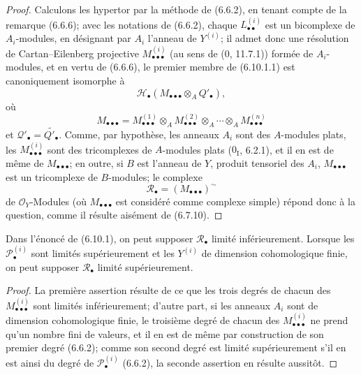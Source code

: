 \begin{proof}
Calculons les hypertor par la méthode de (6.6.2), en tenant compte de la remarque
(6.6.6); avec les notations de (6.6.2), chaque
$L_{\bullet\bullet}^{(i)}$ est un bicomplexe de $A_i$-modules, en désignant par
$A_i$ l'anneau de $Y^{(i)}$; il admet donc une résolution de Cartan--Eilenberg
projective $M_{\bullet\bullet\bullet}^{(i)}$ (au sens de (0, 11.7.1)) formée de
$A_i$-modules, et en vertu de (6.6.6), le premier membre de (6.10.1.1) est
canoniquement isomorphe à
\[
  \mathscr H_\bullet
  (M_{\bullet\bullet\bullet}\otimes_A Q'_\bullet),
\]
où
\[
  M_{\bullet\bullet\bullet}
  =
  M_{\bullet\bullet\bullet}^{(1)}
  \otimes_A M_{\bullet\bullet\bullet}^{(2)}
  \otimes_A\cdots\otimes_A M_{\bullet\bullet\bullet}^{(n)}
\]
et $\mathscr Q'_\bullet=\widetilde{Q'_\bullet}$. Comme, par hypothèse, les
anneaux $A_i$ sont des $A$-modules plats, les
$M_{\bullet\bullet\bullet}^{(i)}$ sont des tricomplexes de $A$-modules plats
($0_{\mathrm I}$, 6.2.1), et il en est de même de
$M_{\bullet\bullet\bullet}$; en outre, si $B$ est l'anneau de $Y$, produit
tensoriel des $A_i$, $M_{\bullet\bullet\bullet}$ est un tricomplexe de
$B$-modules; le complexe
\[
  \mathscr R_\bullet=(M_{\bullet\bullet\bullet})^\sim
\]
de $\mathscr O_Y$-Modules (où $M_{\bullet\bullet\bullet}$ est considéré comme
complexe simple) répond donc à la question, comme il résulte aisément de
(6.7.10).
\end{proof}

\begin{corollary}[6.10.2]
Dans l'énoncé de (6.10.1), on peut supposer $\mathscr R_\bullet$ limité
inférieurement. Lorsque les $\mathscr P_\bullet^{(i)}$ sont limités
supérieurement et les $Y^{(i)}$ de dimension cohomologique finie, on peut
supposer $\mathscr R_\bullet$ limité supérieurement.
\end{corollary}

\begin{proof}
La première assertion résulte de ce que les trois degrés de chacun des
$M_{\bullet\bullet\bullet}^{(i)}$ sont limités inférieurement; d'autre part, si
les anneaux $A_i$ sont de dimension cohomologique finie, le troisième degré de
chacun des $M_{\bullet\bullet\bullet}^{(i)}$ ne prend qu'un nombre fini de
valeurs, et il en est de même par construction de son premier degré (6.6.2);
comme son second degré est limité supérieurement s'il en est ainsi du degré de
$\mathscr P_\bullet^{(i)}$ (6.6.2), la seconde assertion en résulte aussitôt.
\end{proof}

